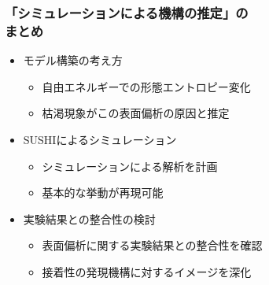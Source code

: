 \documentclass[12pt, dvipdfmx]{beamer}
\begin{document}
\begin{frame}
	\frametitle{「シミュレーションによる機構の推定」の\\まとめ}
        \begin{boxnote}
            \vspace{-3mm}
            \begin{itemize}
                \item モデル構築の考え方
                    \begin{itemize}
						\item 自由エネルギーでの形態エントロピー変化
                        \item 枯渇現象がこの表面偏析の原因と推定
                    \end{itemize} 
                \item SUSHIによるシミュレーション
                    \begin{itemize}
                        \item シミュレーションによる解析を計画
                        \item 基本的な挙動が再現可能
                    \end{itemize} 
                \item 実験結果との整合性の検討
                    \begin{itemize}
                        \item 表面偏析に関する実験結果との整合性を確認
                        \item 接着性の発現機構に対するイメージを深化
                    \end{itemize}
            \end{itemize}
        \end{boxnote}
\end{frame}






%
%
\end{document}
